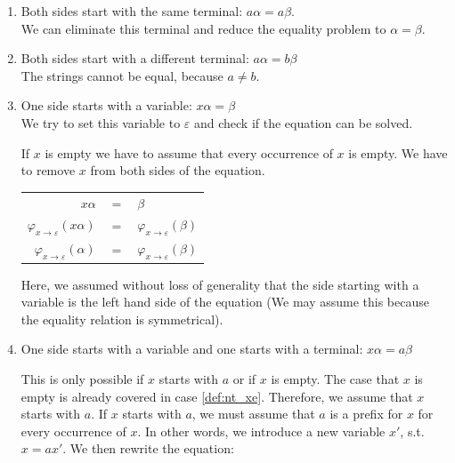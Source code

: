 \begin{enumerate}
    \item \label{def:nt_aa}
        Both sides start with the same terminal: $a\alpha = a\beta$. \\
        We can eliminate this terminal and reduce the equality problem to $\alpha =\beta$.
    
    \item \label{def:nt_ab}
        Both sides start with a different terminal: $a\alpha = b\beta$ \\
        The strings cannot be equal, because $a \neq b$.
        
    \item \label{def:nt_xe}
        One side starts with a variable: $x\alpha = \beta$ \\
        We try to set this variable to $\varepsilon$ and check if the equation can be solved.
        
        If $x$ is empty we have to assume that every occurrence of $x$ is empty. We have to remove $x$ from both sides of the equation.

        \begin{center}
        \begin{tabular}{r c l}
            $x\alpha$ & $=$ & $\beta$ \\    
            $\varphi_{x \rightarrow \varepsilon}(x\alpha)$ & $=$ & $\varphi_{x \rightarrow \varepsilon}(\beta)$ \\
            $\varphi_{x \rightarrow \varepsilon}(\alpha)$ & $=$ & $\varphi_{x \rightarrow \varepsilon}(\beta)$
        \end{tabular}
        \end{center}

        Here, we assumed without loss of generality that the side starting with a variable is the left hand side of the equation (We may assume this because the equality relation is symmetrical).

    \item \label{def:nt_xa}
        One side starts with a variable and one starts with a terminal: $x\alpha = a\beta$
        
        This is only possible if $x$ starts with $a$ or if $x$ is empty. The case that $x$ is empty is already covered in case \ref{def:nt_xe}. Therefore, we assume that $x$ starts with $a$. If $x$ starts with $a$, we must assume that $a$ is a prefix for $x$ for every occurrence of $x$. In other words, we introduce a new variable $x'$, s.t. $x = ax'$. We then rewrite the equation:
        

\end{enumerate}
